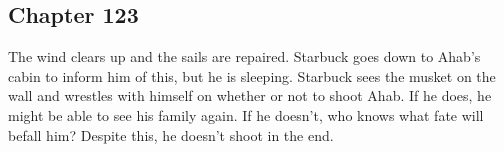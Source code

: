\subsection{Chapter 123}

The wind clears up and the sails are repaired. Starbuck goes down to Ahab's
cabin to inform him of this, but he is sleeping. Starbuck sees the musket on
the wall and wrestles with himself on whether or not to shoot Ahab. If he does,
he might be able to see his family again. If he doesn't, who knows what fate
will befall him? Despite this, he doesn't shoot in the end.
